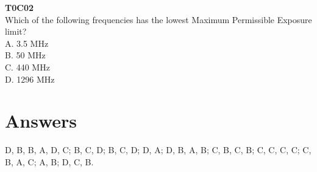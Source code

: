 \documentclass[12pt,letterpaper,twocolumn]{report}
\begin{document}
\textbf{T0C02}\\
Which of the following frequencies has the lowest Maximum Permissible Exposure limit?\\
A. 3.5 MHz\\
B. 50 MHz\\
C. 440 MHz\\
D. 1296 MHz\\

\newpage
\onecolumn
\section{Answers}
D, B, B, A, D, C; B, C, D; B, C, D; D, A; D, B, A, B; C, B, C, B; C, C, C, C; C, B, A, C; A, B; D, C, B.
\end{document}
